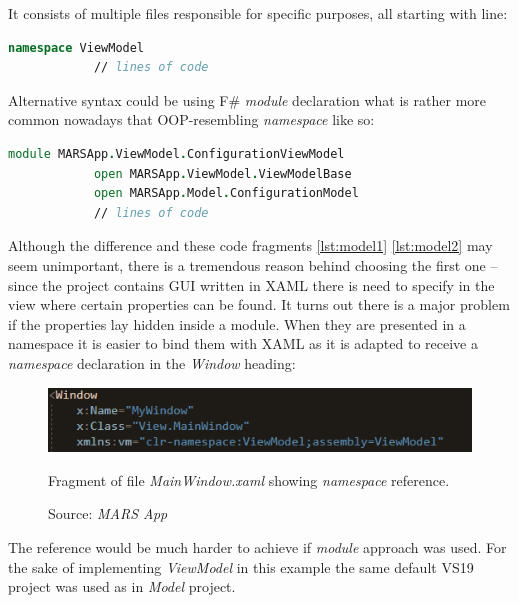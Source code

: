         It consists of multiple files responsible for specific purposes, all starting with line:
        
        \begin{lstlisting}[language=FSharp, label={lst:model1}, caption=F\# all \textit{ViewModel} project components beginning.]
            namespace ViewModel
            // lines of code
        \end{lstlisting}
        Alternative syntax could be using F\# \textit{module} declaration what is rather more common nowadays that OOP-resembling \textit{namespace} like so:
        \begin{lstlisting}[language=FSharp, label={lst:model2}, caption=F\# alternative example \textit{ViewModel} project component beginning.]
            module MARSApp.ViewModel.ConfigurationViewModel
            open MARSApp.ViewModel.ViewModelBase
            open MARSApp.Model.ConfigurationModel
            // lines of code
        \end{lstlisting}
        Although the difference and these code fragments \ref{lst:model1} \ref{lst:model2} may seem unimportant, there is a tremendous reason behind choosing the first one -- since the project contains GUI written in XAML there is need to specify in the view where certain properties can be found. It turns out there is a major problem if the properties lay hidden inside a module. When they are presented in a namespace it is easier to bind them with XAML as it is adapted to receive a \textit{namespace} declaration in the \textit{Window} heading:
        \begin{figure}[H]
            \centering
            \includegraphics{img/viewmodel_namespace.png}
            \caption{Fragment of file \textit{MainWindow.xaml} showing \textit{namespace} reference.}
            \caption*{Source: \textit{MARS App}}
            \label{fig:viewmodel_namespace}
        \end{figure}
        The reference would be much harder to achieve if \textit{module} approach was used.
        For the sake of implementing \textit{ViewModel} in this example the same default VS19 project was used as in \textit{Model} project.
        
